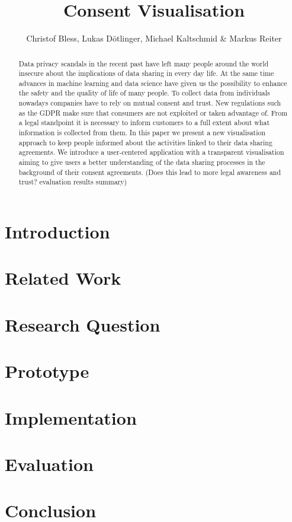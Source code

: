 \documentclass[notitlepage,11pt]{article}
\begin{document}
\title{Consent Visualisation}
\author{Christof Bless, Lukas Dötlinger, Michael Kaltschmid \& Markus Reiter}
\maketitle
\begin{abstract}
Data privacy scandals in the recent past have left many people around the world insecure about the implications of data sharing in every day life. 
At the same time advances in machine learning and data science have given us the possibility to enhance the safety and the quality of life of many people.
To collect data from individuals nowadays companies have to rely on mutual consent and trust. New regulations such as the GDPR make sure that consumers are not exploited or taken advantage of.
From a legal standpoint it is necessary to inform customers to a full extent about what information is collected from them.
In this paper we present a new visualisation approach to keep people informed about the activities linked to their data sharing agreements. We introduce a user-centered application with a transparent visualisation aiming to give users a better understanding of the data sharing processes in the background of their consent agreements.
(Does this lead to more legal awareness and trust? evaluation results summary)
\end{abstract}

\section{Introduction}
\label{sec:introduction}


\section{Related Work}
\label{sec:related_work}


\section{Research Question}
\label{sec:research_question}


\section{Prototype}
\label{sec:prototyping}


\section{Implementation}
\label{sec:implementation}


\section{Evaluation}
\label{sec:evaluation}


\section{Conclusion}
\label{sec:conclusion}


\newpage
\printbibliography
\end{document}
